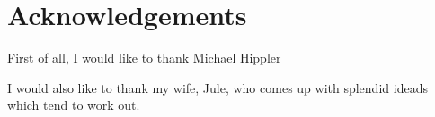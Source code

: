 \cleardoublepage
\chapter*{Acknowledgements}

First of all, I would like to thank Michael Hippler

I would also like to thank my wife, Jule, who comes up with splendid ideads
which tend to work out.